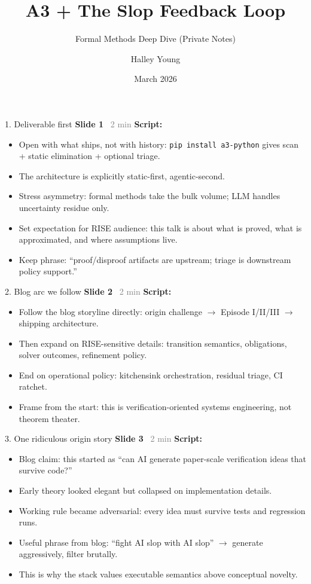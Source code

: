 \documentclass[aspectratio=169]{beamer}
\title{A3 + The Slop Feedback Loop}
\subtitle{Formal Methods Deep Dive (Private Notes)}
\author{Halley Young}
\date{March 2026}
\newcommand{\syncline}[2]{\textbf{#1} \hfill \textcolor{gray}{#2}}
\begin{document}
\begin{frame}
\titlepage
\end{frame}

\begin{frame}{1. Deliverable first}
\syncline{Slide 1}{~2 min}
\textbf{Script:}
\begin{itemize}
  \item Open with what ships, not with history: \texttt{pip install a3-python} gives scan + static elimination + optional triage.
  \item The architecture is explicitly static-first, agentic-second.
  \item Stress asymmetry: formal methods take the bulk volume; LLM handles uncertainty residue only.
  \item Set expectation for RISE audience: this talk is about what is proved, what is approximated, and where assumptions live.
  \item Keep phrase: ``proof/disproof artifacts are upstream; triage is downstream policy support.''
\end{itemize}
\end{frame}

\begin{frame}{2. Blog arc we follow}
\syncline{Slide 2}{~2 min}
\textbf{Script:}
\begin{itemize}
  \item Follow the blog storyline directly: origin challenge \(\rightarrow\) Episode I/II/III \(\rightarrow\) shipping architecture.
  \item Then expand on RISE-sensitive details: transition semantics, obligations, solver outcomes, refinement policy.
  \item End on operational policy: kitchensink orchestration, residual triage, CI ratchet.
  \item Frame from the start: this is verification-oriented systems engineering, not theorem theater.
\end{itemize}
\end{frame}

\begin{frame}{3. One ridiculous origin story}
\syncline{Slide 3}{~2 min}
\textbf{Script:}
\begin{itemize}
  \item Blog claim: this started as ``can AI generate paper-scale verification ideas that survive code?''
  \item Early theory looked elegant but collapsed on implementation details.
  \item Working rule became adversarial: every idea must survive tests and regression runs.
  \item Useful phrase from blog: ``fight AI slop with AI slop'' \(\rightarrow\) generate aggressively, filter brutally.
  \item This is why the stack values executable semantics above conceptual novelty.
\end{itemize}
\end{frame}
\end{document}
